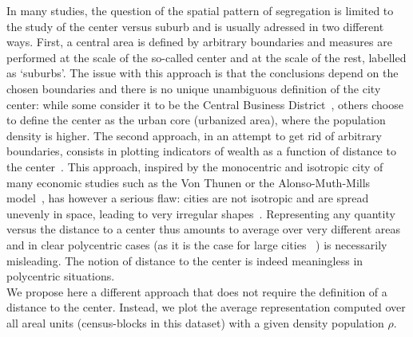 In many studies, the question of the spatial pattern of segregation is limited
to the study of the center versus suburb and is usually adressed in two
different ways. First, a central area is defined by arbitrary boundaries and
measures are performed at the scale of the so-called center and at the scale of
the  rest, labelled as `suburbs'. The issue with this approach is that the
conclusions depend on the chosen boundaries and there is no unique unambiguous
definition of the city center: while some consider it to be the Central Business
District~\cite{Glaeser:2008}, others choose to define the center as the urban
core (urbanized area), where the population density is higher. The second
approach, in an attempt to get rid of arbitrary boundaries, consists in plotting
indicators of wealth as a function of distance to the
center~\cite{Glaeser:2008}. This approach, inspired by the monocentric and
isotropic city of many economic studies such as the Von Thunen or the
Alonso-Muth-Mills model~\cite{Brueckner:1987}, has however a serious flaw:
cities are not isotropic and are spread unevenly in space, leading to very
irregular shapes~\cite{Makse:1995}. Representing any quantity versus the
distance to a center thus amounts to average over very different areas and in
clear polycentric cases (as it is the case for large cities
~\cite{Louf:2013_polycentric})
is necessarily misleading. The notion of distance to the center is indeed
meaningless in polycentric situations.\\


We propose here a different approach that does not require the
definition of a distance to the center. Instead, we plot the average
representation computed over all areal units (census-blocks in this
dataset) with a given density population $\rho$.


